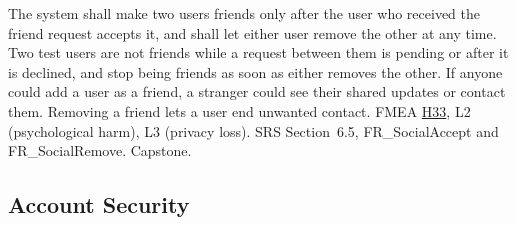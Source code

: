 \documentclass{article}
\newcommand{\hazref}[1]{\hyperref[#1]{#1}}
\begin{document}
\begin{description}
{The system shall make two users friends only after the user who received the
friend request accepts it, and shall let either user remove the other at any
time.}
{Two test users are not friends while a request between them is pending or
after it is declined, and stop being friends as soon as either removes the
other.}
{If anyone could add a user as a friend, a stranger could see their shared
updates or contact them. Removing a friend lets a user end unwanted contact.}
{FMEA \hazref{H33}, L2 (psychological harm), L3 (privacy loss).}
{SRS Section~6.5, FR\_SocialAccept and FR\_SocialRemove.}
{Capstone.}

\end{description}

\subsection{Account Security}
\end{document}
